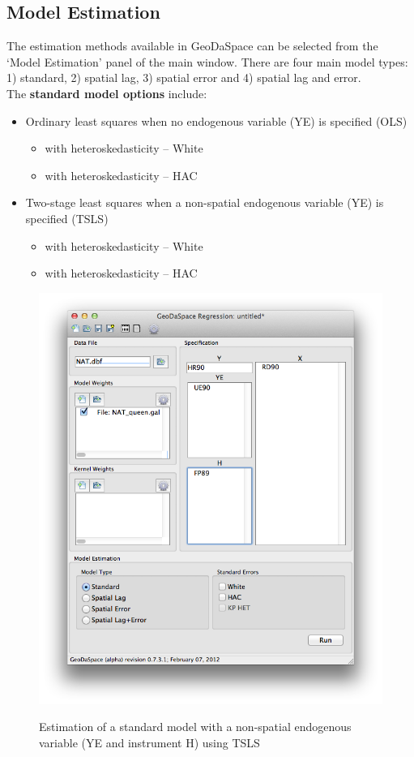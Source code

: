 \documentclass{article}
\begin{document}
\subsection{Model Estimation}
The estimation methods available in GeoDaSpace can be selected from the `Model Estimation' panel of the main window. There are four main model types: 1) standard, 2) spatial lag, 3) spatial error and 4) spatial lag and error. \\

The \textbf{standard model options} include:

\begin{itemize}
      \item Ordinary least squares when no endogenous variable (YE) is specified (OLS)
     \begin{itemize}
          \item with heteroskedasticity -- White
          \item with heteroskedasticity -- HAC
      \end{itemize}
     \item Two-stage least squares  when a non-spatial endogenous variable (YE) is specified (TSLS)
      \begin{itemize}
          \item with heteroskedasticity -- White
          \item with heteroskedasticity -- HAC
         \end{itemize}
\end{itemize}

\begin{figure}[htb]
\begin{center}
\includegraphics[width=0.7\linewidth]{tsls.png}\\
\caption{Estimation of a standard model with a non-spatial endogenous variable (YE and instrument H) using TSLS}
\label{f:tsls}
\end{center}
\end{figure}
\end{document}
